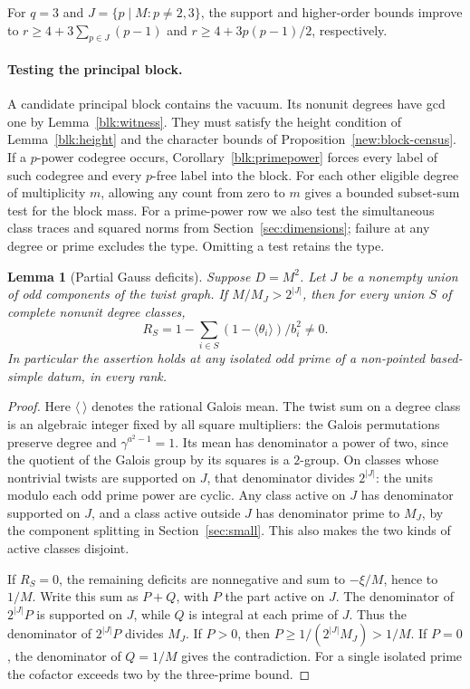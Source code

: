 \documentclass[11pt]{amsart}
\numberwithin{equation}{section}
\newtheorem{lemma}[theorem]{Lemma}
\theoremstyle{definition}
\theoremstyle{plain}
\begin{document}
For $q=3$ and $J=\{p\mid M:p\ne 2,3\}$, the support and higher-order bounds improve to $r\ge4+3\sum_{p\in J}(p-1)$ and $r\ge4+3p(p-1)/2$, respectively.

\paragraph{Testing the principal block.}
A candidate principal block contains the vacuum. Its nonunit degrees
have gcd one by Lemma~\ref{blk:witness}. They must satisfy the height
condition of Lemma~\ref{blk:height} and the character bounds of
Proposition~\ref{new:block-census}. If a $p$-power codegree occurs,
Corollary~\ref{blk:primepower} forces every label of such codegree
and every $p$-free label into the block. For each other eligible degree
of multiplicity $m$, allowing any count from zero to $m$ gives a
bounded subset-sum test for the block mass. For a prime-power row we also test the simultaneous class traces and
squared norms from Section~\ref{sec:dimensions}; failure at any degree or prime
excludes the type. Omitting a test retains the type.

\begin{lemma}[Partial Gauss deficits]\label{r4:prefix}
Suppose $D=M^2$. Let $J$ be a nonempty union of odd components of the twist
graph. If $M/M_J>2^{|J|}$, then for every union $S$ of complete nonunit
degree classes,
\[
 R_S=1-\sum_{i\in S}(1-\langle\theta_i\rangle)/b_i^2\ne0 .
\]
In particular the assertion holds at any isolated odd prime of a
non-pointed based-simple datum, in every rank.
\end{lemma}
\begin{proof}
Here $\langle\ \rangle$ denotes the rational Galois mean.
The twist sum on a degree class is an algebraic integer fixed by all
square multipliers: the Galois permutations preserve degree and
$\gamma^{a^2-1}=1$. Its mean has denominator a power of two,
since the quotient of the Galois group by its squares is a $2$-group.
On classes whose nontrivial twists are supported on $J$, that
denominator divides $2^{|J|}$: the units modulo each odd prime
power are cyclic. Any class active on $J$ has denominator supported
on $J$, and a class active outside $J$ has denominator prime to
$M_J$, by the component splitting in Section~\ref{sec:small}.
This also makes the two kinds of active classes disjoint.

If $R_S=0$, the remaining deficits are nonnegative and sum to
$-\xi/M$, hence to $1/M$. Write this sum as $P+Q$, with $P$ the
part active on $J$. The denominator of $2^{|J|}P$ is supported on
$J$, while $Q$ is integral at each prime of $J$. Thus the denominator
of $2^{|J|}P$ divides $M_J$. If $P>0$, then
$P\ge1/(2^{|J|}M_J)>1/M$. If $P=0$, the denominator of
$Q=1/M$ gives the contradiction. For a single isolated prime the
cofactor exceeds two by the three-prime bound.
\end{proof}
\end{document}
